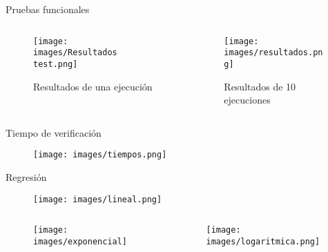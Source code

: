 \documentclass[8pt,xcolor=dvipsnames]{beamer}
\begin{document}
\begin{frame}[fragile]{Pruebas funcionales}
    \begin{columns}
        \begin{column}{0.45\textwidth}
            \begin{figure}
                \centering
                \texttt{[image: images/Resultados test.png]}
                \caption{Resultados de una ejecución}
            \end{figure}
        \end{column}
        \begin{column}{0.45\textwidth}
            \begin{figure}
                \centering
                \texttt{[image: images/resultados.png]}
                \caption{Resultados de 10 ejecuciones}
            \end{figure}
        \end{column}
    \end{columns}
\end{frame}


\begin{frame}[fragile]{Tiempo de verificación}
    \begin{figure}
        \centering
        \texttt{[image: images/tiempos.png]}
    \end{figure}
\end{frame}


\begin{frame}[fragile]{Regresión}
    \begin{figure}
        \centering
        \texttt{[image: images/lineal.png]}
    \end{figure}
    \begin{columns}
        \begin{column}{0.45\textwidth}
            \begin{figure}
                \centering
                \texttt{[image: images/exponencial]}
            \end{figure}
        \end{column}
        \begin{column}{0.45\textwidth}
            \begin{figure}
                \centering
                \texttt{[image: images/logaritmica.png]}
            \end{figure}
        \end{column}
    \end{columns}
\end{frame}
\end{document}
